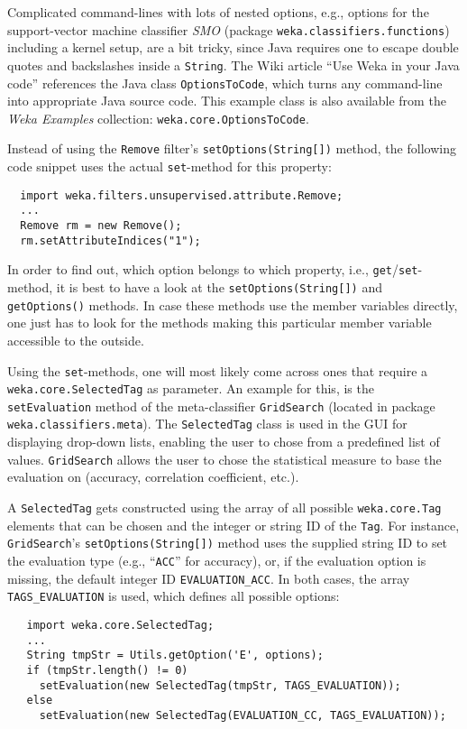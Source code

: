 Complicated command-lines with lots of nested options, e.g., options for the
support-vector machine classifier \textit{SMO} (package
\texttt{weka.classifiers.functions}) including a kernel setup, are a bit tricky,
since Java requires one to escape double quotes and backslashes inside a
\texttt{String}. The Wiki\cite{wekawiki} article ``Use Weka in your Java code''
references the Java class \texttt{OptionsToCode}, which turns any command-line
into appropriate Java source code. This example class is also available from the
\textit{Weka Examples} collection\cite{wekaexamples}:
\texttt{weka.core.OptionsToCode}.

\newpage

Instead of using the \texttt{Remove} filter's \texttt{setOptions(String[])}
method, the following code snippet uses the actual \texttt{set}-method for this
property:
\begin{verbatim}
  import weka.filters.unsupervised.attribute.Remove;
  ...
  Remove rm = new Remove();
  rm.setAttributeIndices("1");
\end{verbatim}
In order to find out, which option belongs to which property, i.e.,
\texttt{get}/\texttt{set}-method, it is best to have a look at the
\texttt{setOptions(String[])} and \texttt{getOptions()} methods. In case these
methods use the member variables directly, one just has to look for the methods
making this particular member variable accessible to the outside.

Using the \texttt{set}-methods, one will most likely come across ones that
require a \texttt{weka.core.SelectedTag} as parameter. An example for this, is
the \texttt{setEvaluation} method of the meta-classifier \texttt{GridSearch}
(located in package \texttt{weka.classifiers.meta}). The \texttt{SelectedTag}
class is used in the GUI for displaying drop-down lists, enabling the user to
chose from a predefined list of values. \texttt{GridSearch} allows the user to
chose the statistical measure to base the evaluation on (accuracy, correlation
coefficient, etc.).

A \texttt{SelectedTag} gets constructed using the array of all possible
\texttt{weka.core.Tag} elements that can be chosen and the integer or string ID
of the \texttt{Tag}. For instance, \texttt{GridSearch}'s
\texttt{setOptions(String[])} method uses the supplied string ID to set the
evaluation type (e.g., ``\texttt{ACC}'' for accuracy), or, if the
evaluation option is missing, the default integer ID \texttt{EVALUATION\_ACC}.
In both cases, the array \texttt{TAGS\_EVALUATION} is used, which defines all
possible options:
\begin{verbatim}
   import weka.core.SelectedTag;
   ...
   String tmpStr = Utils.getOption('E', options);
   if (tmpStr.length() != 0)
     setEvaluation(new SelectedTag(tmpStr, TAGS_EVALUATION));
   else
     setEvaluation(new SelectedTag(EVALUATION_CC, TAGS_EVALUATION));
\end{verbatim}

